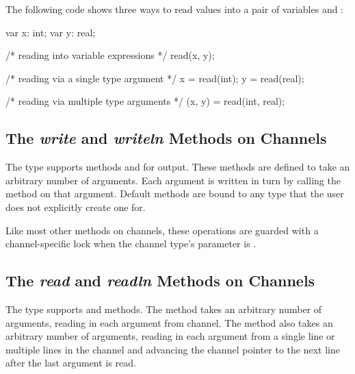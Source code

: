\begin{example}
The following code shows three ways to read values into a pair of
variables  and :
\begin{chapel}
var x: int;
var y: real;

/* reading into variable expressions */
read(x, y);

/* reading via a single type argument */
x = read(int);
y = read(real);

/* reading via multiple type arguments */
(x, y) = read(int, real);
\end{chapel}
\end{example}

\label{User_Defined_writeThis_Methods}

\subsection{The {\em write} and {\em writeln} Methods on Channels}
\label{IO_channel_write}

The  type supports methods  and 
for output.  These methods are defined to take an arbitrary number of
arguments.  Each argument is written in turn by calling
the  method on that argument.
Default  methods are bound to any type that the user
does not explicitly create one for.

Like most other methods on channels,
these operations are guarded with a channel-specific lock
when the channel type's  parameter is .


\subsection{The {\em read} and {\em readln} Methods on Channels}
\label{IO_channel_read}

The  type supports  and  methods.
The  method takes an arbitrary number of arguments, reading
in each argument from channel.  The  method also
takes an arbitrary number of arguments, reading in each argument
from a single line or multiple lines in the channel and 
advancing the channel pointer to the next line after the last argument 
is read.

